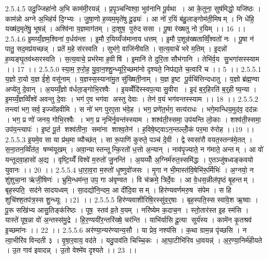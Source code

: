 2.5.4.5
उदु॒ज्जिहा॑नो अ॒भि काम॑मी॒रयन्न्॑ । प्र॒पृ॒ञ्चन्विश्वा॒ भुव॑नानि पू॒र्वथा । आ के॒तुना॒ सुष॑मिद्धो॒ यजि॑ष्ठः । काम॑न्नो अग्ने अ॒भिह॑र्य दि॒ग्भ्यः । जु॒षा॒णो ह॒व्यम॒मृते॑षु दू॒ढ्यः॑ । आ नो॑ र॒यिं ब॑हु॒लाङ्गोम॑ती॒मिषम् । नि धे॑हि॒ यख्ष॑द॒मृते॑षु॒ भूषन्न्॑ । अश्वि॑ना य॒ज्ञमाग॑तम् । दा॒शुष॒ पुरु॑दससा । पू॒षा र॑ख्षतु नो र॒यिम् ।। 16 ।।
2.5.4.6
इ॒मय्यँ॒ज्ञम॒श्विना॑ व॒र्धय॑न्ता । इ॒मौ र॒यिय्यँज॑मानाय धत्तम् । इ॒मौ प॒शून्र॑ख्षताव्विँ॒श्वतो॑ नः । पू॒षा न॑ पातु॒ सद॒मप्र॑यच्छन्न् । प्रते॑ म॒हे स॑रस्वति । सुभ॑गे॒ वाजि॑नीवति । स॒त्य॒वाचे॑ भरे म॒तिम् । इ॒दन्नो॑ ह॒व्यङ्घृ॒तव॑थ्सरस्वति । स॒त्य॒वाचे॒ प्रभ॑रेमा ह॒वीषि॑ । इ॒मानि॑ ते दुरि॒ता सौभ॑गानि । तेभि॑र्व॒य सु॒भगा॑सस्स्याम ।। 17 ।।
2.5.5.0
स्या॒म॒ रु॒रो॒ह॒ यु॒वा॒न॒श्शु॒न्ध्यूरि॒च्छमा॑नो दृश्यते॒ निप॑द्यते च॒त्वारि॑ च ।। 5 ।।
2.5.5.1
य॒ज्ञो रा॒यो य॒ज्ञ ई॑शे॒ वसू॑नाम् । य॒ज्ञस्स॒स्याना॑मु॒त सु॑ख्षिती॒नाम् । य॒ज्ञ इ॒ष्ट पू॒र्वचि॑त्तिन्दधातु । य॒ज्ञो ब्र॑ह्म॒ण्वा अप्ये॑तु दे॒वान् । अ॒यय्यँ॒ज्ञो व॑र्धता॒ङ्गोभि॒रश्वैः । इ॒यव्वेँदि॑स्स्वप॒त्या सु॒वीरा । इ॒दं ब॒र्॒हिरति॑ ब॒र्॒हीष्य॒न्या । इ॒मय्यँ॒ज्ञव्विँश्वे॑ अवन्तु दे॒वाः । भग॑ ए॒व भग॑वा अस्तु देवाः । तेन॑ व॒यं भग॑वन्तस्स्याम ।। 18 ।।
2.5.5.2
तन्त्वा॑ भग॒ सर्व॒ इज्जो॑हवीमि । स नो॑ भग पुरए॒ता भ॑वे॒ह । भग॒ प्रणे॑त॒र्भग॒ सत्य॑राधः । भगे॒मान्धिय॒मुद॑व॒ दद॑न्नः । भग॒ प्र णो॑ जनय॒ गोभि॒रश्वैः । भग॒ प्र नृभि॑र्नृ॒वन्त॑स्स्याम । शश्व॑ती॒स्समा॒ उप॑यन्ति लो॒काः । शश्व॑ती॒स्समा॒ उप॑य॒न्त्यापः॑ । इ॒ष्टं पू॒र्त शश्व॑तीना॒॒ समा॑ना शाश्व॒तेन॑ । ह॒विषे॒ष्ट्वाऽन॒न्तल्लोँ॒कं पर॒मा रु॑रोह ।।19 ।।
2.5.5.3
इ॒यमे॒व सा या प्र॑थ॒मा व्यौच्छ॑त् । सा रू॒पाणि॑ कुरुते॒ पञ्च॑ दे॒वी । द्वे स्वसा॑रौ वयत॒स्तन्त्र॑मे॒तत् । स॒ना॒तन॒व्विँत॑त॒॒ षण्म॑यूखम् । अवा॒न्यास्तन्तून्कि॒रतो॑ ध॒त्तो अ॒न्यान् । नाव॑पृ॒ज्याते॒ न ग॑माते॒ अन्तम् । आ वो॑ यन्तूदवा॒हासो॑ अ॒द्य । वृष्टि॒य्येँ विश्वे॑ म॒रुतो॑ जु॒नन्ति॑ । अ॒यय्योँ अ॒ग्निर्म॑रुत॒स्समि॑द्धः । ए॒तञ्जु॑षध्वङ्कवयो युवानः ।। 20 ।।
2.5.5.4
धा॒रा॒व॒रा म॒रुतो॑ धृ॒ष्णुवो॑जसः । मृ॒गा न भी॒मास्त॑वि॒षेभि॑रू॒र्मिभिः॑ । अ॒ग्नयो॒ न शु॑शुचा॒ना ऋ॑जी॒षिणः॑ । भ्रुमि॒न्धम॑न्त॒ उप॒ गा अ॑वृण्वत । वि च॑क्रमे॒ त्रिर्दे॒वः । आ वे॒धस॒न्नील॑पृष्ठं बृ॒हन्तम् । बृह॒स्पति॒॒ सद॑ने सादयध्वम् । सा॒दद्यो॑नि॒न्दम॒ आ दी॑दि॒वासम् । हिर॑ण्यवर्णमरु॒ष स॑पेम । स हि शुचि॑श्श॒तप॑त्र॒स्स शु॒न्ध्यूः ।।21 ।।
2.5.5.5
हिर॑ण्यवाशीरिषि॒रस्सु॑व॒र्॒षाः । बृह॒स्पति॒स्स स्वा॑वे॒श ऋ॒ष्वाः । पू॒रू सखि॑भ्य आसु॒तिङ्क॑रिष्ठः । पूष॒॒ स्तव॑ व्र॒ते व॒यम् । नरि॑ष्येम क॒दाच॒न । स्तो॒तार॑स्त इ॒ह स्म॑सि । यास्ते॑ पूष॒न्ना वो॑ अ॒न्तस्स॑मु॒द्रे । हि॒र॒ण्ययी॑र॒न्तरि॑ख्षे॒ चर॑न्ति । याभि॑र्यासि दू॒त्या सूर्य॑स्य । कामे॑न कृ॒तश्रव॑ इ॒च्छमा॑नः ।। 22 ।।
2.5.5.6
अर॑ण्या॒न्यर॑ण्यान्य॒सौ । या प्रेव॒ नश्य॑सि । क॒था ग्राम॒न्न पृ॑च्छसि । न त्वा॒भीरि॑व विन्दती ३ । वृ॒षा॒र॒वाय॒ वद॑ते । यदु॒पाव॑ति चिच्चि॒कः । आ॒घा॒टीभि॑रिव धा॒वयन्न्॑ । अ॒र॒ण्या॒निर्म॑हीयते । उ॒त गाव॑ इवादन्न् । उ॒तो वेश्मे॑व दृश्यते ।। 23 ।।
